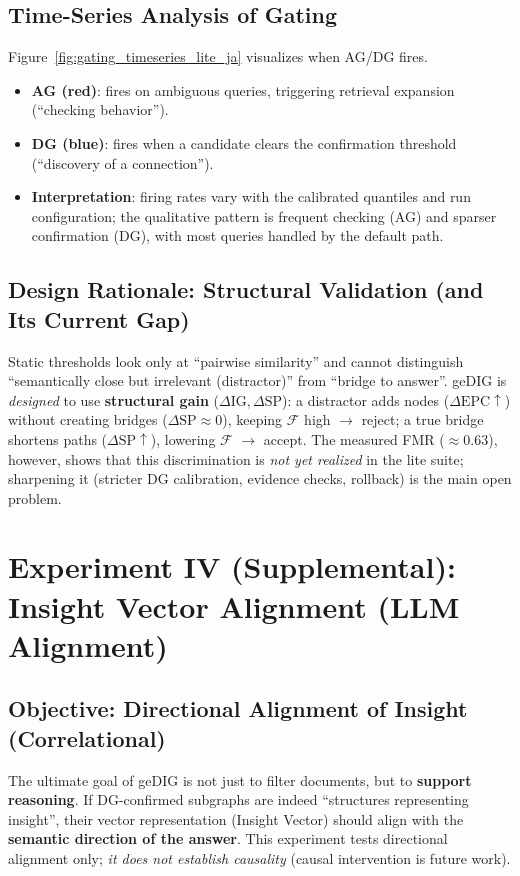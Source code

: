 \documentclass[12pt]{article}
\newcommand{\F}{\mathcal{F}}
\begin{document}
\subsection{Time-Series Analysis of Gating}
Figure~\ref{fig:gating_timeseries_lite_ja} visualizes when AG/DG fires.
\begin{itemize}
    \item \textbf{AG (red)}: fires on ambiguous queries, triggering retrieval expansion (``checking behavior'').
    \item \textbf{DG (blue)}: fires when a candidate clears the confirmation threshold (``discovery of a connection'').
    \item \textbf{Interpretation}: firing rates vary with the calibrated quantiles and run configuration; the qualitative pattern is frequent checking (AG) and sparser confirmation (DG), with most queries handled by the default path.
\end{itemize}

\subsection{Design Rationale: Structural Validation (and Its Current Gap)}
Static thresholds look only at ``pairwise similarity'' and cannot distinguish ``semantically close but irrelevant (distractor)'' from ``bridge to answer''.
geDIG is \emph{designed} to use \textbf{structural gain} ($\Delta\mathrm{IG}, \Delta\mathrm{SP}$): a distractor adds nodes ($\Delta\mathrm{EPC}\uparrow$) without creating bridges ($\Delta\mathrm{SP}\approx 0$), keeping $\F$ high $\to$ reject; a true bridge shortens paths ($\Delta\mathrm{SP}\uparrow$), lowering $\F$ $\to$ accept.
The measured FMR ($\approx$0.63), however, shows that this discrimination is \emph{not yet realized} in the lite suite; sharpening it (stricter DG calibration, evidence checks, rollback) is the main open problem.

\section{Experiment IV (Supplemental): Insight Vector Alignment (LLM Alignment)}
\label{sec:alignment_experiment}

\subsection{Objective: Directional Alignment of Insight (Correlational)}
The ultimate goal of geDIG is not just to filter documents, but to \textbf{support reasoning}.
If DG-confirmed subgraphs are indeed ``structures representing insight'', their vector representation (Insight Vector) should align with the \textbf{semantic direction of the answer}.
This experiment tests directional alignment only; \emph{it does not establish causality} (causal intervention is future work).
\end{document}

